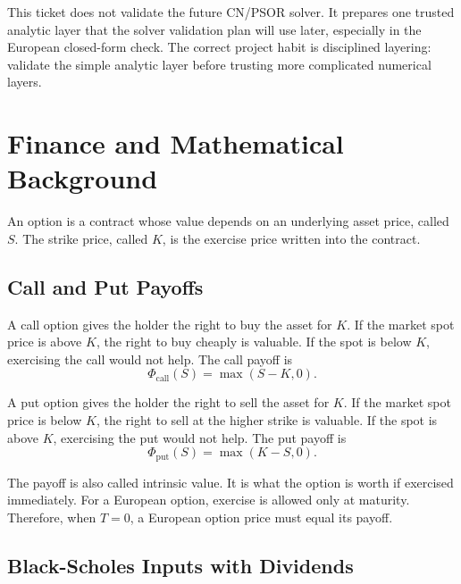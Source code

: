 \documentclass[11pt,a4paper]{article}
\begin{document}
This ticket does not validate the future CN/PSOR solver. It prepares one trusted analytic layer
that the solver validation plan will use later, especially in the European closed-form check. The
correct project habit is disciplined layering: validate the simple analytic layer before trusting
more complicated numerical layers.

\section{Finance and Mathematical Background}

An option is a contract whose value depends on an underlying asset price, called \(S\). The strike
price, called \(K\), is the exercise price written into the contract.

\subsection{Call and Put Payoffs}

A call option gives the holder the right to buy the asset for \(K\). If the market spot price is
above \(K\), the right to buy cheaply is valuable. If the spot is below \(K\), exercising the call
would not help. The call payoff is
\begin{equation}
  \Phi_{\mathrm{call}}(S) = \max(S-K,0).
\end{equation}

A put option gives the holder the right to sell the asset for \(K\). If the market spot price is
below \(K\), the right to sell at the higher strike is valuable. If the spot is above \(K\),
exercising the put would not help. The put payoff is
\begin{equation}
  \Phi_{\mathrm{put}}(S) = \max(K-S,0).
\end{equation}

The payoff is also called intrinsic value. It is what the option is worth if exercised immediately.
For a European option, exercise is allowed only at maturity. Therefore, when \(T=0\), a European
option price must equal its payoff.

\subsection{Black-Scholes Inputs with Dividends}
\end{document}
